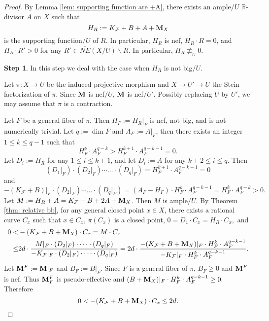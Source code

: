 \documentclass[11pt]{amsart}
\numberwithin{equation}{section}
\newcommand{\Mm}{{\bf{M}}}
\newcommand{\Rr}{\mathbb{R}}
\newcommand{\Ff}{\mathcal{F}}
\theoremstyle{definition}
\theoremstyle{definition}
\theoremstyle{definition}
\begin{document}
\begin{proof}
\medskip

By Lemma \ref{lem: supporting function are +A}, there exists an ample$/U$ $\Rr$-divisor $A$ on $X$ such that
$$H_R:=K_{\Ff}+B+A+\Mm_X$$
is the supporting function$/U$ of $R$. In particular, $H_R$ is nef, $H_R\cdot R=0$, and $H_R\cdot R'>0$ for any $R'\in\overline{NE}(X/U)\backslash R$. In particular, $H_R\not\equiv_U 0$. 

\medskip

\noindent\textbf{Step 1}. In this step we deal with the case when $H_R$ is not big$/U$. 

Let $\pi: X\rightarrow U$ be the induced projective morphism and $X\rightarrow U'\rightarrow U$ the Stein factorization of $\pi$. Since $\Mm$ is nef$/U$, $\Mm$ is nef$/U'$. Possibly replacing $U$ by $U'$, we may assume that $\pi$ is a contraction.

Let $F$ be a general fiber of $\pi$. Then $H_F:=H_R|_F$ is nef, not big, and is not numerically trivial. Let $q:=\dim F$ and $A_F:=A|_F$, then there exists an integer $1\leq k\leq q-1$ such that
$$H_F^k\cdot A_F^{q-k}>H_F^{k+1}\cdot A_F^{q-k-1}=0.$$
Let $D_i:=H_R$ for any $1\leq i\leq k+1$, and let $D_i:=A$ for any $k+2\leq i\leq q$. Then
$$(D_1|_F)\cdot (D_2|_F)\cdots\dots\cdot (D_q|_F)=H_F^{k+1}\cdot A_F^{q-k-1}=0$$
and
$$-(K_{\Ff}+B)|_F\cdot (D_2|_F)\cdots\dots\cdot (D_q|_F)=(A_F-H_F)\cdot H_F^{k}\cdot A_F^{q-k-1}=H_F^{k}\cdot A_F^{q-k}>0.$$
Let $M:=H_R+A=K_{\Ff}+B+2A+\Mm_X$. Then $M$ is ample$/U$. By Theorem \ref{thm: relative bb}, for any general closed point $x\in X$, there exists a rational curve $C_x$ such that $x\in C_x$, $\pi(C_x)$ is a closed point, $0=D_1\cdot C_x=H_R\cdot C_x,$ and
\begin{align*}
    0<&-(K_{\Ff}+B+\Mm_X)\cdot C_x=M\cdot C_x\\
    \leq& 2d\cdot\frac{M|_F\cdot  (D_2|_F)\cdot\dots\cdot (D_q|_F)}{-K_{\Ff}|_F\cdot  (D_2|_F)\cdot\dots\cdot (D_q|_F)}=2d\cdot\frac{-(K_{\Ff}+B+\Mm_X)|_F\cdot H_F^k\cdot A_F^{q-k-1}}{-K_{\Ff}|_F\cdot H_F^k\cdot A_F^{q-k-1}}.
\end{align*}
Let $\Mm^F:=\Mm|_F$ and $B_F:=B|_F$. Since $F$ is a general fiber of $\pi$, $B_F\geq 0$ and $\Mm^F$ is nef. Thus $\Mm^F_F$ is pseudo-effective and $(B+\Mm_X)|_F\cdot H_F^k\cdot A_F^{q-k-1}\geq 0.$ Therefore 
$$0<-(K_{\Ff}+B+\Mm_X)\cdot C_x\leq 2d.$$



\end{proof}
\end{document}
